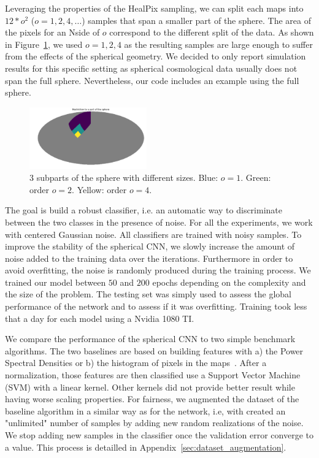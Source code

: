 \documentclass[final,twocolumn,3p,times,authoryear]{elsarticle}
\newcommand{\todo}[1]{{\color[rgb]{.6,.1,.6}{#1}}}
\newcommand{\figref}[1]{Figure~\ref{fig:#1}}
\newcommand{\1}{\b{1}}              %
\newcommand{\0}{\b{0}}              %
\begin{document}
Leveraging the properties of the HealPix sampling, we can split each maps
into $12*o^2$ ($o=1,2,4,\dots$) samples that span a smaller part of the sphere. 
The area of the pixels for an Nside of $o$ correspond to the different split of the data.
As shown in \figref{subpart_sphere}, we used $o=1,2,4$ as the resulting
samples are large enough to suffer from the effects of the spherical geometry. We
decided to only report simulation results for this specific setting as spherical
cosmological data usually does not span the full sphere. Nevertheless, our code
includes an example using the full sphere.

\begin{figure}[!ht]
\centering
\includegraphics[width=0.45\textwidth]{figures/part_sphere.pdf}
\caption{3 subparts of the sphere with different sizes. Blue: $o=1$. Green: order $o=2$. Yellow: order $o=4$.}
\label{fig:subpart_sphere}
\end{figure}

The goal is build a robust classifier, i.e. an automatic way to
discriminate between the two classes in the presence of noise. For all the
experiments, we work with centered Gaussian noise. \todo{Tomek: could you put a
justification.} All classifiers are trained with noisy samples. To improve the
stability of the spherical CNN, we slowly increase the amount of noise added to
the training data over the iterations. Furthermore in order to avoid
overfitting, the noise is randomly produced during the training process. We trained our
model between $50$ and $200$ epochs depending on the complexity and the size of
the problem. The testing set was simply used to assess the global performance of
the network and to assess if it was overfitting.
Training took less that a day for each model using a Nvidia 1080 TI.

We compare the performance of the spherical CNN to two simple benchmark
algorithms. The two baselines are based on building features with a) the Power
Spectral Densities or b) the histogram of pixels in the maps~\cite{patton2017cosmologicalconstraints}.
After a normalization, those features are then classified use a Support Vector
Machine (SVM) with a linear kernel. Other kernels did not provide better result
while having worse scaling properties. For fairness, we augmented the dataset
of the baseline algorithm in a similar way as for the network, i.e, with
created an "unlimited" number of samples by adding new random realizations of
the noise. We stop adding new samples in the classifier once the validation
error converge to a value. This process is detailled in Appendix~\ref{sec:dataset_augmentation}.
\end{document}
